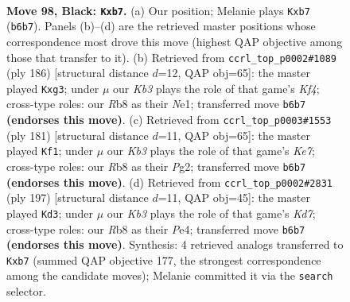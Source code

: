 \documentclass[11pt]{article}
\begin{document}
\clearpage

\begin{figure}[p]\centering
\begin{subfigure}{0.46\textwidth}\centering
\resizebox{\linewidth}{!}{%
\newchessgame
\chessboard[
  setfen={1r6/1P6/1k3R2/6R1/4K3/8/b7/8 b - - 4 98},
  showmover=false,
  pgfstyle=straightmove, color=movearrow, markmove={b6-b7}
]}
\caption{}
\end{subfigure}\hfill
\begin{subfigure}{0.46\textwidth}\centering
\resizebox{\linewidth}{!}{%
\newchessgame
\chessboard[
  setfen={8/8/8/8/2r2K2/1R4p1/4k3/4N3 w - - 11 94},
  showmover=false,
  pgfstyle=straightmove, color=movearrow, markmove={f4-g3}
]}
\caption{}
\end{subfigure}
\\[4pt]
\begin{subfigure}{0.46\textwidth}\centering
\resizebox{\linewidth}{!}{%
\newchessgame
\chessboard[
  setfen={8/2P5/4R3/8/3K4/8/4k1p1/2r5 b - - 12 91},
  showmover=false,
  pgfstyle=straightmove, color=movearrow, markmove={e2-f1}
]}
\caption{}
\end{subfigure}\hfill
\begin{subfigure}{0.46\textwidth}\centering
\resizebox{\linewidth}{!}{%
\newchessgame
\chessboard[
  setfen={8/7r/8/8/4p3/4P3/1R1k4/5K2 b - - 19 99},
  showmover=false,
  pgfstyle=straightmove, color=movearrow, markmove={d2-d3}
]}
\caption{}
\end{subfigure}
\caption{\textbf{Move 98, Black: \texttt{Kxb7}.} (a) Our position; Melanie plays \texttt{Kxb7} (\texttt{b6b7}). Panels (b)--(d) are the retrieved master positions whose correspondence most drove this move (highest QAP objective among those that transfer to it). (b) Retrieved from \texttt{ccrl\_top\_p0002\#1089} (ply 186) [structural distance $d$=12, QAP obj=65]: the master played \texttt{Kxg3}; under $\mu$ our \emph{Kb3} plays the role of that game's \emph{Kf4}; cross-type roles: our \emph{R}b8 as their \emph{N}e1; transferred move \texttt{b6b7} \textbf{(endorses this move)}. (c) Retrieved from \texttt{ccrl\_top\_p0003\#1553} (ply 181) [structural distance $d$=11, QAP obj=65]: the master played \texttt{Kf1}; under $\mu$ our \emph{Kb3} plays the role of that game's \emph{Ke7}; cross-type roles: our \emph{R}b8 as their \emph{P}g2; transferred move \texttt{b6b7} \textbf{(endorses this move)}. (d) Retrieved from \texttt{ccrl\_top\_p0002\#2831} (ply 197) [structural distance $d$=11, QAP obj=45]: the master played \texttt{Kd3}; under $\mu$ our \emph{Kb3} plays the role of that game's \emph{Kd7}; cross-type roles: our \emph{R}b8 as their \emph{P}e4; transferred move \texttt{b6b7} \textbf{(endorses this move)}. Synthesis: 4 retrieved analogs transferred to \texttt{Kxb7} (summed QAP objective 177, the strongest correspondence among the candidate moves); Melanie committed it via the \texttt{search} selector.}
\label{fig:thought-m195}
\end{figure}
\end{document}
